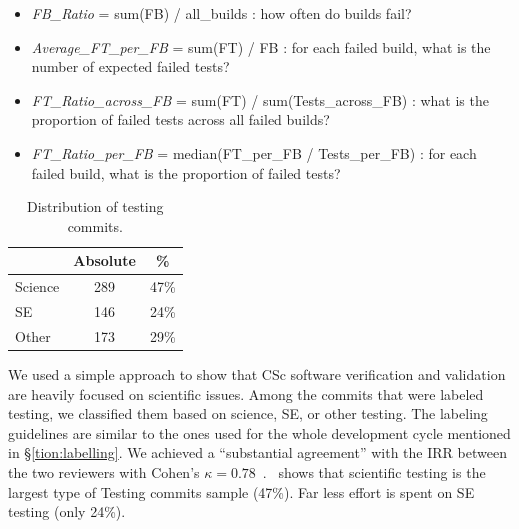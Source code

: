 \documentclass[conference,10pt]{IEEEtran}
\newcommand{\bi}{\begin{itemize}}
\newcommand{\ei}{\end{itemize}}
\begin{document}
\bi
 \item  \textit{FB\_Ratio} = sum(FB) / all\_builds : how often do builds fail? 
 \item  \textit{Average\_FT\_per\_FB} = sum(FT) / FB : for each failed build, what is the number of expected failed tests? 
 \item  \textit{FT\_Ratio\_across\_FB} = sum(FT) / sum(Tests\_across\_FB) : what is the proportion of failed tests across all failed builds? 
 \item  \textit{FT\_Ratio\_per\_FB} = median(FT\_per\_FB / Tests\_per\_FB) : for each failed build, what is the proportion of failed tests?
\ei

\begin{table}
\vspace{-10pt}
\caption{Distribution of testing  commits.}\label{tbl:testing}
\vspace{-5pt}
\footnotesize \begin{tabular}{l|c|c}
\multicolumn{1}{c|}{} & \multicolumn{1}{c|}{Absolute} & \multicolumn{1}{c}{\%}\\
\hline
Science & 289 & 47\% \\
SE & 146 & 24\% \\
Other & 173 & 29\% 
\end{tabular}
\vspace{-10pt}
\end{table}We used a simple approach to show that CSc software verification and validation are heavily focused on scientific issues. Among the commits that were labeled testing, we classified them based on science, SE, or other testing. The labeling guidelines are similar to the ones used for the whole development cycle mentioned in \S\ref{tion:labelling}. We achieved a ``substantial agreement'' with the IRR between the two reviewers with Cohen's 
\mbox{$\kappa = 0.78$~\cite{irr_kappa}}.~ shows that scientific testing is the largest type of Testing commits sample (47\%). 
Far less effort is spent on SE testing (only 24\%). 
\end{document}
